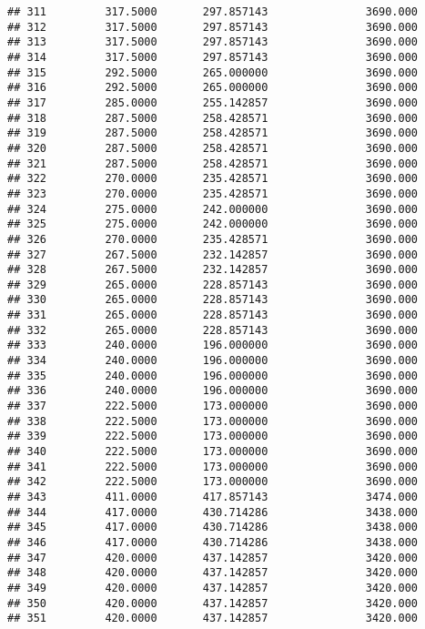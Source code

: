 \documentclass[]{article}
\begin{document}
\begin{verbatim}
## 311         317.5000       297.857143               3690.000
## 312         317.5000       297.857143               3690.000
## 313         317.5000       297.857143               3690.000
## 314         317.5000       297.857143               3690.000
## 315         292.5000       265.000000               3690.000
## 316         292.5000       265.000000               3690.000
## 317         285.0000       255.142857               3690.000
## 318         287.5000       258.428571               3690.000
## 319         287.5000       258.428571               3690.000
## 320         287.5000       258.428571               3690.000
## 321         287.5000       258.428571               3690.000
## 322         270.0000       235.428571               3690.000
## 323         270.0000       235.428571               3690.000
## 324         275.0000       242.000000               3690.000
## 325         275.0000       242.000000               3690.000
## 326         270.0000       235.428571               3690.000
## 327         267.5000       232.142857               3690.000
## 328         267.5000       232.142857               3690.000
## 329         265.0000       228.857143               3690.000
## 330         265.0000       228.857143               3690.000
## 331         265.0000       228.857143               3690.000
## 332         265.0000       228.857143               3690.000
## 333         240.0000       196.000000               3690.000
## 334         240.0000       196.000000               3690.000
## 335         240.0000       196.000000               3690.000
## 336         240.0000       196.000000               3690.000
## 337         222.5000       173.000000               3690.000
## 338         222.5000       173.000000               3690.000
## 339         222.5000       173.000000               3690.000
## 340         222.5000       173.000000               3690.000
## 341         222.5000       173.000000               3690.000
## 342         222.5000       173.000000               3690.000
## 343         411.0000       417.857143               3474.000
## 344         417.0000       430.714286               3438.000
## 345         417.0000       430.714286               3438.000
## 346         417.0000       430.714286               3438.000
## 347         420.0000       437.142857               3420.000
## 348         420.0000       437.142857               3420.000
## 349         420.0000       437.142857               3420.000
## 350         420.0000       437.142857               3420.000
## 351         420.0000       437.142857               3420.000

\end{verbatim}
\end{document}
